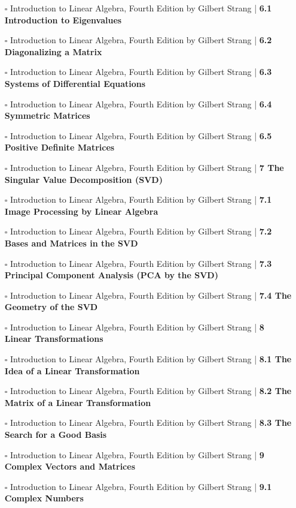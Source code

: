 \documentclass[a4, landscape, 12pt]{article}
\newcommand{\checkbox}{$\square$}%
\begin{document}
\begin{itemize}
{}
\item [\checkbox] Introduction to Linear Algebra, Fourth Edition by Gilbert Strang  | \textbf{6.1 Introduction to Eigenvalues
}
\item [\checkbox] Introduction to Linear Algebra, Fourth Edition by Gilbert Strang  | \textbf{6.2 Diagonalizing a Matrix
}
\item [\checkbox] Introduction to Linear Algebra, Fourth Edition by Gilbert Strang  | \textbf{6.3 Systems of Differential Equations
}
\item [\checkbox] Introduction to Linear Algebra, Fourth Edition by Gilbert Strang  | \textbf{6.4 Symmetric Matrices
}
\item [\checkbox] Introduction to Linear Algebra, Fourth Edition by Gilbert Strang  | \textbf{6.5 Positive Definite Matrices
}
\item [\checkbox] Introduction to Linear Algebra, Fourth Edition by Gilbert Strang  | \textbf{7 The Singular Value Decomposition (SVD)
}
\item [\checkbox] Introduction to Linear Algebra, Fourth Edition by Gilbert Strang  | \textbf{7.1 Image Processing by Linear Algebra
}
\item [\checkbox] Introduction to Linear Algebra, Fourth Edition by Gilbert Strang  | \textbf{7.2 Bases and Matrices in the SVD
}
\item [\checkbox] Introduction to Linear Algebra, Fourth Edition by Gilbert Strang  | \textbf{7.3 Principal Component Analysis (PCA by the SVD)
}
\item [\checkbox] Introduction to Linear Algebra, Fourth Edition by Gilbert Strang  | \textbf{7.4 The Geometry of the SVD
}
\item [\checkbox] Introduction to Linear Algebra, Fourth Edition by Gilbert Strang  | \textbf{8 Linear Transformations
}
\item [\checkbox] Introduction to Linear Algebra, Fourth Edition by Gilbert Strang  | \textbf{8.1 The Idea of a Linear Transformation
}
\item [\checkbox] Introduction to Linear Algebra, Fourth Edition by Gilbert Strang  | \textbf{8.2 The Matrix of a Linear Transformation
}
\item [\checkbox] Introduction to Linear Algebra, Fourth Edition by Gilbert Strang  | \textbf{8.3 The Search for a Good Basis
}
\item [\checkbox] Introduction to Linear Algebra, Fourth Edition by Gilbert Strang  | \textbf{9 Complex Vectors and Matrices
}
\item [\checkbox] Introduction to Linear Algebra, Fourth Edition by Gilbert Strang  | \textbf{9.1 Complex Numbers
}
\end{itemize}
\end{document}
